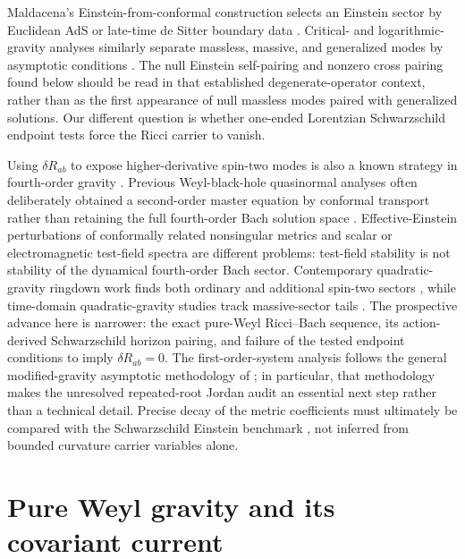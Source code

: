 \documentclass[11pt]{article}
\theoremstyle{definition}
\theoremstyle{remark}
\begin{document}
Maldacena's Einstein-from-conformal construction selects an Einstein sector
by Euclidean AdS or late-time de Sitter boundary data \cite{Maldacena}.
Critical- and logarithmic-gravity analyses similarly separate massless,
massive, and generalized modes by asymptotic conditions
\cite{LuPangPope,BergshoeffLog,DeserJoungWaldron,LiuLuLuo,ChenLuShao}.
The null Einstein self-pairing and nonzero cross pairing found below should
be read in that established degenerate-operator context, rather than as the
first appearance of null massless modes paired with generalized solutions.
Our different question is whether one-ended Lorentzian Schwarzschild endpoint
tests force the Ricci carrier to vanish.

Using \(\delta R_{ab}\) to expose higher-derivative spin-two modes is also a
known strategy in fourth-order gravity \cite{Myung}.  Previous Weyl-black-hole
quasinormal analyses often deliberately obtained a second-order master
equation by conformal transport rather than retaining the full fourth-order
Bach solution space \cite{MomenniaHendi}.  Effective-Einstein perturbations
of conformally related nonsingular metrics \cite{ChenChen} and scalar or
electromagnetic test-field spectra \cite{MomenniaHendiBidgoli} are different
problems: test-field stability is not stability of the dynamical fourth-order
Bach sector.  Contemporary quadratic-gravity ringdown work finds both
ordinary and additional spin-two sectors \cite{AntoniouGualtieriPani}, while
time-domain quadratic-gravity studies track massive-sector tails
\cite{KonoplyaSpinaZhidenko}.  The prospective advance here is narrower:
the exact pure-Weyl Ricci--Bach sequence, its action-derived Schwarzschild
horizon pairing, and failure of the tested endpoint conditions to imply
\(\delta R_{ab}=0\).  The first-order-system analysis follows the general
modified-gravity asymptotic methodology of \cite{LangloisNouiRoussille}; in
particular, that methodology makes the unresolved repeated-root Jordan audit
an essential next step rather than a technical detail.  Precise decay of the
metric coefficients must ultimately be compared with the Schwarzschild
Einstein benchmark \cite{HungKellerWang}, not inferred from bounded curvature
carrier variables alone.

\section{Pure Weyl gravity and its covariant current}
\end{document}
